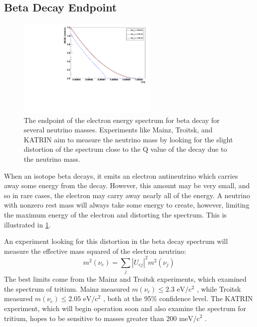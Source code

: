 \documentclass[herrin-thesis.tex]{subfiles}
\begin{document}
\subsection{Beta Decay Endpoint}
\begin{figure}[htp]
	\centering
	\includegraphics[width=0.6\textwidth]{./plots/nu_beta_endpt.pdf}
	\caption[Beta decay spectrum endpoint for massive neutrinos]{The endpoint of the electron energy spectrum for beta decay for several neutrino masses. Experiments like Mainz, Troitsk, and KATRIN aim to measure the neutrino mass by looking for the slight distortion of the spectrum close to the Q value of the decay due to the neutrino mass.}
	\label{fig:nu_beta_endpt}
\end{figure}

When an isotope beta decays, it emits an electron antineutrino which carries away some energy from the decay. However, this amount may be very small, and so in rare cases, the electron may carry away nearly all of the energy. A neutrino with nonzero rest mass will always take some energy to create, however, limiting the maximum energy of the electron and distorting the spectrum. This is illustrated in \cref{fig:nu_beta_endpt}.

An experiment looking for this distortion in the beta decay spectrum will measure the effective mass squared of the electron neutrino:
\begin{equation}
m^2\left(\nu_e\right) = \sum_j \left | U_{e j} \right |^2 m^2\left(\nu_j\right)
\label{eq:nu_beta_endpt_mass}
\end{equation}
The best limits come from the Mainz and Troitsk experiments, which examined the spectrum of tritium. Mainz measured \(m(\nu_e) \leq 2.3 \text{ eV}/\text{c}^{2}\) \cite{Kraus:2005nx}, while Troitsk measured \(m(\nu_e) \leq 2.05 \text{ eV}/\text{c}^{2}\) \cite{Aseev:2011dq}, both at the 95\% confidence level. The KATRIN experiment, which will begin operation soon and also examine the spectrum for tritium, hopes to be sensitive to masses greater than \(200\text{ meV}/\text{c}^2\) \cite{Osipowicz:2001oq}.
\end{document}
